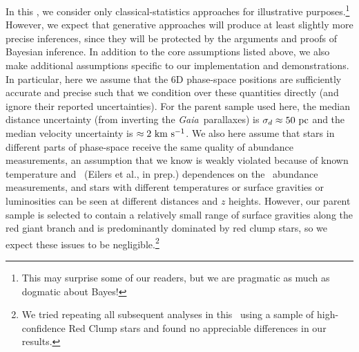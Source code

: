 \documentclass[modern]{aastex63}
\newcommand{\gaia}{\textsl{Gaia}}
\newcommand{\apogee}{\acronym{APOGEE}}
\begin{document}
In this \documentname, we consider only classical-statistics approaches for
illustrative purposes.\footnote{This may surprise some of our readers, but we
are pragmatic as much as dogmatic about Bayes!}
However, we expect that generative approaches will produce at least slightly
more precise inferences, since they will be protected by the arguments and
proofs of Bayesian inference.
In addition to the core assumptions listed above, we also make additional
assumptions specific to our implementation and demonstrations.
In particular, here we assume that the 6D phase-space positions are sufficiently
accurate and precise such that we condition over these quantities directly (and
ignore their reported uncertainties).
For the parent sample used here, the median distance uncertainty (from inverting
the \gaia\ parallaxes) is $\sigma_d \approx 50~\mathrm{pc}$ and the median velocity
uncertainty is $\approx 2~\mathrm{km}~\mathrm{s}^{-1}$.
We also here assume that stars in different parts of phase-space receive the
same quality of abundance measurements, an assumption that we know is weakly
violated because of known temperature \citep{Jonsson:2020} and \logg\ (Eilers et
al., in prep.) dependences on the \apogee\ abundance measurements, and stars
with different temperatures or surface gravities or luminosities can be seen at
different distances and $z$ heights.
However, our parent sample is selected to contain a relatively small range of
surface gravities along the red giant branch and is predominantly dominated by
red clump stars, so we expect these issues to be negligible.\footnote{We tried
repeating all subsequent analyses in this \documentname\ using a sample of
high-confidence Red Clump stars \citep[using the selection defined
in][]{Bovy:2014} and found no appreciable differences in our results.}
\end{document}

